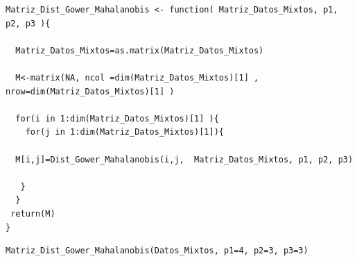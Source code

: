 \documentclass[12pt]{report} %
\begin{document}
 \vspace{1cm}


\begin{lstlisting}
Matriz_Dist_Gower_Mahalanobis <- function( Matriz_Datos_Mixtos, p1, p2, p3 ){
  
  Matriz_Datos_Mixtos=as.matrix(Matriz_Datos_Mixtos)
  
  M<-matrix(NA, ncol =dim(Matriz_Datos_Mixtos)[1] , nrow=dim(Matriz_Datos_Mixtos)[1] )
  
  for(i in 1:dim(Matriz_Datos_Mixtos)[1] ){
    for(j in 1:dim(Matriz_Datos_Mixtos)[1]){
    
  M[i,j]=Dist_Gower_Mahalanobis(i,j,  Matriz_Datos_Mixtos, p1, p2, p3)
  
   }
  }
 return(M)
}
\end{lstlisting}


\begin{lstlisting}
Matriz_Dist_Gower_Mahalanobis(Datos_Mixtos, p1=4, p2=3, p3=3)
\end{lstlisting}
 


 
\end{document}
